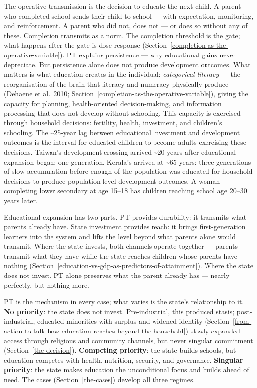 \documentclass[12pt,letterpaper]{article}
\begin{document}
The operative transmission is the decision to educate the next child. A parent who completed school sends their child
to school --- with expectation, monitoring, and reinforcement. A parent
who did not, does not --- or does so without any of these. Completion
transmits as a norm. The completion threshold is the gate; what happens
after the gate is dose-response
(Section~\ref{completion-as-the-operative-variable}).
PT explains persistence --- why educational gains never depreciate. But
persistence alone does not produce development outcomes. What matters is
what education creates in the individual: \emph{categorical literacy}
--- the reorganisation of the brain that literacy and numeracy physically
produce (Dehaene et al.~2010; Section~\ref{completion-as-the-operative-variable}),
giving the capacity for planning, health-oriented decision-making, and
information processing that does not develop without schooling.
This capacity is exercised
through household decisions: fertility, health, investment, and
children's schooling. The \textasciitilde25-year
lag between educational investment and development outcomes is the
interval for educated children to become adults exercising these
decisions. Taiwan's development crossing arrived \textasciitilde20 years
after educational expansion began: one generation. Kerala's
arrived at \textasciitilde65 years: three generations of slow
accumulation before enough of the population was educated for household
decisions to produce population-level development outcomes. A woman
completing lower secondary at age 15--18 has children reaching school
age 20--30 years later.

Educational expansion has two parts. PT provides durability: it
transmits what parents already have. State investment provides reach: it
brings first-generation learners into the system and lifts the level
beyond what parents alone would transmit. Where the state invests, both
channels operate together --- parents transmit what they have while the
state reaches children whose parents have nothing (Section~\ref{education-vs-gdp-as-predictors-of-attainment}). Where
the state does not invest, PT alone preserves what the parent already
has --- nearly perfectly, but nothing more.

PT is the mechanism in every case; what varies is the state's
relationship to it. \textbf{No priority}: the state does not invest. Pre-industrial, this
produced stasis; post-industrial, educated minorities with surplus and
widened identity (Section~\ref{from-action-to-talk-how-education-reaches-beyond-the-household}) slowly expanded access through religious
and community channels, but never singular commitment (Section~\ref{the-decision}).
\textbf{Competing priority}: the state builds schools, but education
competes with health, nutrition, security, and governance.
\textbf{Singular priority}: the state makes education the unconditional
focus and builds ahead of need. The cases (Section~\ref{the-cases}) develop all three
regimes.
\end{document}
